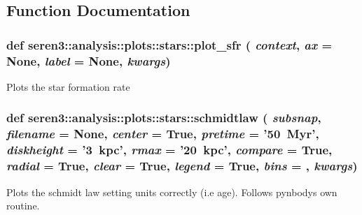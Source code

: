 \subsection{Function Documentation}
\hypertarget{namespaceseren3_1_1analysis_1_1plots_1_1stars_a58d424bd1e6b0f4702eb71aa96a284b4}{
\subsubsection[{plot\_\-sfr}]{\setlength{\rightskip}{0pt plus 5cm}def seren3::analysis::plots::stars::plot\_\-sfr ( {\em context}, \/   {\em ax} = {\ttfamily None}, \/   {\em label} = {\ttfamily None}, \/   {\em kwargs})}}
\label{namespaceseren3_1_1analysis_1_1plots_1_1stars_a58d424bd1e6b0f4702eb71aa96a284b4}
\begin{DoxyVerb}
Plots the star formation rate
\end{DoxyVerb}
 \hypertarget{namespaceseren3_1_1analysis_1_1plots_1_1stars_a0a46bbde959b6176761e2501d638eb9f}{
\subsubsection[{schmidtlaw}]{\setlength{\rightskip}{0pt plus 5cm}def seren3::analysis::plots::stars::schmidtlaw ( {\em subsnap}, \/   {\em filename} = {\ttfamily None}, \/   {\em center} = {\ttfamily True}, \/   {\em pretime} = {\ttfamily '50~Myr'}, \/   {\em diskheight} = {\ttfamily '3~kpc'}, \/   {\em rmax} = {\ttfamily '20~kpc'}, \/   {\em compare} = {\ttfamily True}, \/   {\em radial} = {\ttfamily True}, \/   {\em clear} = {\ttfamily True}, \/   {\em legend} = {\ttfamily True}, \/   {\em bins} = {}, \/   {\em kwargs})}}
\label{namespaceseren3_1_1analysis_1_1plots_1_1stars_a0a46bbde959b6176761e2501d638eb9f}
\begin{DoxyVerb}
Plots the schmidt law setting units correctly (i.e age).
Follows pynbodys own routine.
\end{DoxyVerb}
 